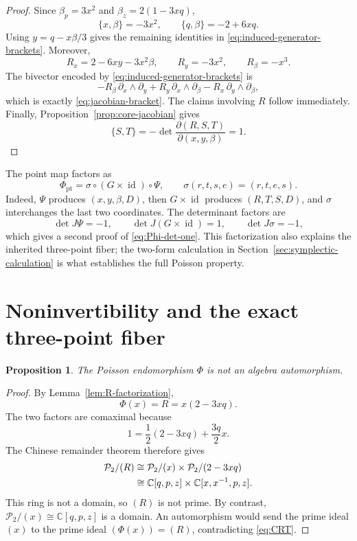 \documentclass[11pt]{article}
\newcommand{\C}{\mathbb C}
\newcommand{\Pcal}{\mathcal P}
\newcommand{\id}{\operatorname{id}}
\newtheorem{proposition}[theorem]{Proposition}
\theoremstyle{remark}
\begin{document}
\begin{proof}
Since \(\beta_p=3x^2\) and \(\beta_z=2(1-3xq)\),
\[
  \{x,\beta\}=-3x^2,
  \qquad
  \{q,\beta\}=-2+6xq.
\]
Using \(y=q-x\beta/3\) gives the remaining identities in
\eqref{eq:induced-generator-brackets}.  Moreover,
\[
  R_x=2-6xy-3x^2\beta,
  \qquad
  R_y=-3x^2,
  \qquad
  R_\beta=-x^3.
\]
The bivector encoded by \eqref{eq:induced-generator-brackets} is
\[
  -R_\beta\,\partial_x\wedge\partial_y
  +R_y\,\partial_x\wedge\partial_\beta
  -R_x\,\partial_y\wedge\partial_\beta,
\]
which is exactly \eqref{eq:jacobian-bracket}.  The claims involving \(R\)
follow immediately.  Finally, Proposition~\ref{prop:core-jacobian} gives
\[
  \{S,T\}
  =-\det\frac{\partial(R,S,T)}{\partial(x,y,\beta)}=1.
\]
\end{proof}

The point map factors as
\begin{equation}\label{eq:point-factorization}
  \Phi_{\mathrm{pt}}
  =\sigma\circ(G\times\id)\circ\Psi,
  \qquad
  \sigma(r,t,s,e)=(r,t,e,s).
\end{equation}
Indeed, \(\Psi\) produces \((x,y,\beta,D)\), then
\(G\times\id\) produces \((R,T,S,D)\), and \(\sigma\) interchanges the last
two coordinates.  The determinant factors are
\[
  \det J\Psi=-1,
  \qquad
  \det J(G\times\id)=1,
  \qquad
  \det J\sigma=-1,
\]
which gives a second proof of \eqref{eq:Phi-det-one}.  This factorization also
explains the inherited three-point fiber; the two-form calculation in
Section~\ref{sec:symplectic-calculation} is what establishes the full Poisson
property.

\section{Noninvertibility and the exact three-point fiber}\label{sec:noninvertibility}

\begin{proposition}\label{prop:not-automorphism}
The Poisson endomorphism \(\Phi\) is not an algebra automorphism.
\end{proposition}

\begin{proof}
By Lemma~\ref{lem:R-factorization},
\[
  \Phi(x)=R=x(2-3xq).
\]
The two factors are comaximal because
\begin{equation}\label{eq:bezout}
  1=\frac12(2-3xq)+\frac{3q}{2}x.
\end{equation}
The Chinese remainder theorem therefore gives
\begin{align}
  \Pcal_2/(R)
  &\cong \Pcal_2/(x)\times\Pcal_2/(2-3xq)\notag\\
  &\cong \C[q,p,z]\times\C[x,x^{-1},p,z].
  \label{eq:CRT}
\end{align}
This ring is not a domain, so \((R)\) is not prime.  By contrast,
\(\Pcal_2/(x)\cong\C[q,p,z]\) is a domain.  An automorphism would send the
prime ideal \((x)\) to the prime ideal \((\Phi(x))=(R)\), contradicting
\eqref{eq:CRT}.
\end{proof}
\end{document}
